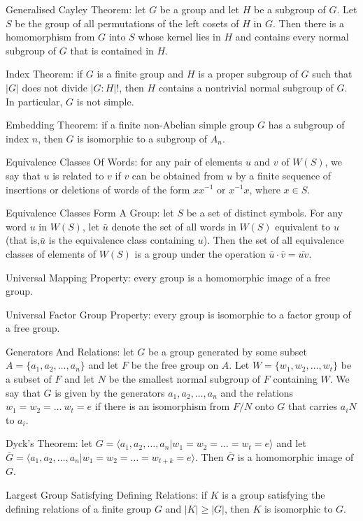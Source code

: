 Generalised Cayley Theorem: let $G$ be a group and let $H$ be a subgroup of $G$. Let $S$ be the group of all permutations of the left cosets of $H$ in $G$. Then there is a homomorphism from $G$ into $S$ whose kernel lies in $H$ and contains every normal subgroup of $G$ that is contained in $H$.

Index Theorem: if $G$ is a finite group and $H$ is a proper subgroup of $G$ such that $|G|$ does not divide $|G:H|!$, then $H$ contains a nontrivial normal subgroup of $G$. In particular, $G$ is not simple.

Embedding Theorem: if a finite non-Abelian simple group $G$ has a subgroup of index $n$, then $G$ is isomorphic to a subgroup of $A_n$.

Equivalence Classes Of Words: for any pair of elements $u$ and $v$ of $W(S)$, we say that $u$ is related to $v$ if $v$ can be obtained from $u$ by a finite sequence of insertions or deletions of words of the form $xx^{-1}$ or $x^{-1}x$, where $x \in S$.

Equivalence Classes Form A Group: let $S$ be a set of distinct symbols. For any word $u$ in $W(S)$, let $\bar{u}$ denote the set of all words in $W(S)$ equivalent to $u$ (that is,$\bar{u}$ is the equivalence class containing $u$). Then the set of all equivalence classes of elements of $W(S)$ is a group under the operation $\bar{u} \cdot \bar{v} = \bar{uv}$.

Universal Mapping Property: every group is a homomorphic image of a free group.

Universal Factor Group Property: every group is isomorphic to a factor group of a free group.

Generators And Relations: let $G$ be a group generated by some subset $A = \{ a_1,a_2,\dots,a_n \}$ and let $F$ be the free group on $A$. Let $W = \{w_1,w_2,\dots,w_t \}$ be a subset of $F$ and let $N$ be the smallest normal subgroup of $F$ containing $W$. We say that $G$ is given by the generators $a_1,a_2,\dots,a_n$ and the relations $w_1 = w_2 = \dots \ w_t = e$ if there is an isomorphism from $F/N$ onto $G$ that carries $a_i N$ to $a_i$.

Dyck's Theorem: let $G = \langle a_1,a_2,\dots,a_n | w_1=w_2=\dots =w_t=e \rangle$ and let $\bar{G} = \langle a_1,a_2,\dots,a_n | w_1=w_2=\dots =w_{t+k}=e \rangle$. Then $\bar{G}$ is a homomorphic image of $G$.

Largest Group Satisfying Defining Relations: if $K$ is a group satisfying the defining relations of a finite group $G$ and $|K| \ge |G|$, then $K$ is isomorphic to $G$.

